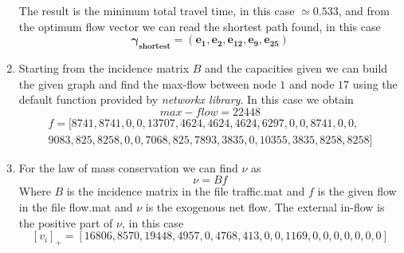 \documentclass[
	12pt, %
]{fphw}
\begin{document}
\begin{enumerate}[{\bfseries (a)}]
\begin{itemize}
    \end{itemize}
    The result is the minimum total travel time, in this case $\simeq 0.533$, and from the optimum flow vector we can read the shortest path found, in this case 
    $$\mathbf{\gamma_{shortest} = (e_1, e_2, e_{12}, e_9, e_{25})}$$
    \item Starting from the incidence matrix $B$ and the capacities given we can build the given graph and find the max-flow between node $1$ and node $17$ using the default function provided by \emph{networkx library}.
    In this case we obtain
    $$
        max-flow = 22448 
    $$
    \begin{multline*}
        f = [ 8741, 8741, 0, 0, 13707, 4624, 4624, 4624, 6297, 0, 0, 8741, 0, 0,\\ 9083, 825, 8258, 0, 0, 7068, 825, 7893, 3835, 0, 10355, 3835, 8258, 8258]
    \end{multline*}
    \item For the law of mass conservation we can find $\nu$ as 
    $$ \nu = Bf$$
    Where $B$ is the incidence matrix in the file traffic.mat and $f$ is the given flow in the file flow.mat and $\nu$ is the exogenous net flow.
    The external in-flow is the positive part of $\nu$, in this case
    $$
        [v_i]_+ = [16806, 8570, 19448, 4957, 0, 4768, 413, 0, 0, 1169, 0, 0, 0, 0, 0, 0, 0]
    $$
    

\end{enumerate}
\end{document}
